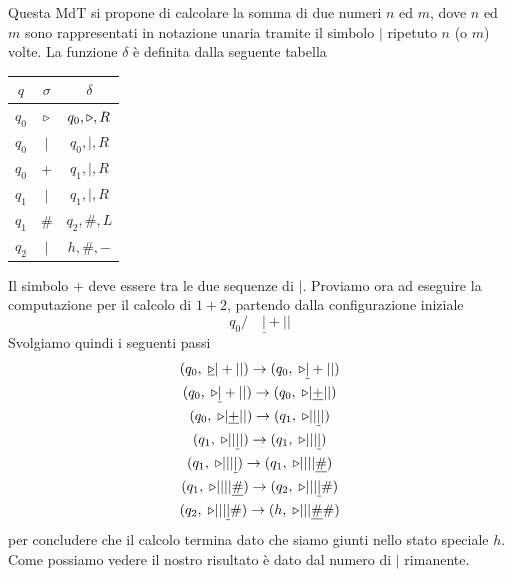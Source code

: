 \begin{example}
	Questa MdT si propone di calcolare la somma di due numeri
	$n$ ed $m$, dove $n$ ed $m$ sono rappresentati in notazione
	unaria tramite il simbolo $|$ ripetuto $n$ (o $m$) volte.
	La funzione $\delta$ è definita dalla seguente tabella
	\begin{center}
		\begin{tabular}{|c|c|c|}
			\hline
			$q$   & $\sigma$ & $\delta$         \\
			\hline
			$q_0$ & $\triangleright$ & $q_0, \triangleright, R$ \\
			$q_0$ & $|$      & $q_0, |, R$      \\
			$q_0$ & $+$      & $q_1, |, R$      \\
			$q_1$ & $|$      & $q_1, |, R$      \\
			$q_1$ & $\#$     & $q_2, \#, L$     \\
			$q_2$ & $|$      & $h, \#, -$       \\
			\hline
		\end{tabular}
	\end{center}
	Il simbolo $+$ deve essere tra le due sequenze di $|$.
	Proviamo ora ad eseguire la computazione per il calcolo
	di $1 + 2$, partendo dalla configurazione iniziale
	\[ q_0/ \quad \underline{|} + | | \]
	Svolgiamo quindi i seguenti passi
	\begin{gather*}
		(q_0, \; \underline{\triangleright} | + | | ) \to
		(q_0, \; \triangleright \underline{|} + | | ) \\
		(q_0, \; \triangleright \underline{|} + | | ) \to
		(q_0, \; \triangleright | \underline{+} | | ) \\
		(q_0, \; \triangleright | \underline{+} | | ) \to
		(q_1, \; \triangleright | | \underline{|} | ) \\
		(q_1, \; \triangleright | | \underline{|} | ) \to
		(q_1, \; \triangleright | | | \underline{|} ) \\
		(q_1, \; \triangleright | | | \underline{|} ) \to
		(q_1, \; \triangleright | | | | \underline{\#} ) \\
		(q_1, \; \triangleright | | | | \underline{\#} ) \to
		(q_2, \; \triangleright | | | \underline{|} \# ) \\
		(q_2, \; \triangleright | | | \underline{|} \# ) \to
		(h, \; \triangleright | | | \underline{\#} \# )
	\end{gather*}
	per concludere che il calcolo termina dato che siamo
	giunti nello stato speciale $h$. Come possiamo vedere il
	nostro risultato è dato dal numero di $|$ rimanente.
\end{example}

